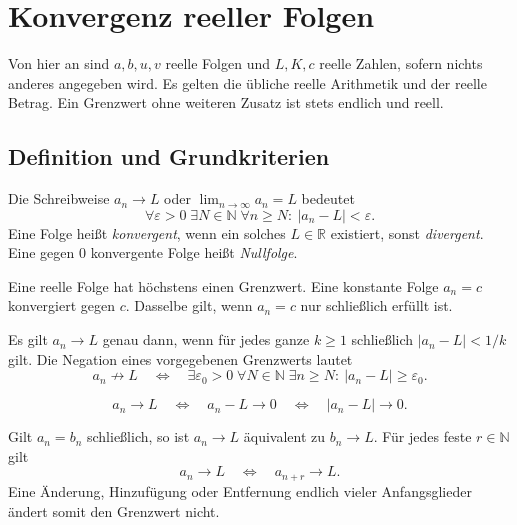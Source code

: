 \chapter{Konvergenz reeller Folgen}
\label{b21guide:ch:limits}

Von hier an sind $a,b,u,v$ reelle Folgen und $L,K,c$ reelle
Zahlen, sofern nichts anderes angegeben wird.
Es gelten die übliche reelle Arithmetik und der reelle Betrag.
Ein Grenzwert ohne weiteren Zusatz ist stets endlich und reell.

\section{Definition und Grundkriterien}

\begin{definition}
\label{b21guide:def:limit}
Die Schreibweise $a_n\to L$ oder
$\lim_{n\to\infty}a_n=L$ bedeutet
\[
 \forall\varepsilon>0\;\exists N\in\mathbb N\;
 \forall n\geq N:\ |a_n-L|<\varepsilon.
\]
Eine Folge heißt \emph{konvergent}, wenn ein solches $L\in\mathbb R$
existiert, sonst \emph{divergent}.
Eine gegen $0$ konvergente Folge heißt \emph{Nullfolge}.
\end{definition}

\begin{theorem}
Eine reelle Folge hat höchstens einen Grenzwert.
Eine konstante Folge $a_n=c$ konvergiert gegen $c$.
Dasselbe gilt, wenn $a_n=c$ nur schließlich erfüllt ist.
\end{theorem}

\begin{theorem}
\label{b21guide:thm:epsilon-test}
Es gilt $a_n\to L$ genau dann, wenn für jedes ganze $k\geq1$
schließlich $|a_n-L|<1/k$ gilt.
Die Negation eines vorgegebenen Grenzwerts lautet
\[
 a_n\not\to L
 \quad\Longleftrightarrow\quad
 \exists\varepsilon_0>0\;\forall N\in\mathbb N\;
 \exists n\geq N:\ |a_n-L|\geq\varepsilon_0.
\]
\end{theorem}

\begin{theorem}
\[
 a_n\to L
 \quad\Longleftrightarrow\quad a_n-L\to0
 \quad\Longleftrightarrow\quad |a_n-L|\to0.
\]
\end{theorem}

\begin{theorem}
\label{b21guide:thm:tail-limit}
Gilt $a_n=b_n$ schließlich, so ist
$a_n\to L$ äquivalent zu $b_n\to L$.
Für jedes feste $r\in\mathbb N$ gilt
\[
 a_n\to L\quad\Longleftrightarrow\quad a_{n+r}\to L.
\]
Eine Änderung, Hinzufügung oder Entfernung endlich vieler
Anfangsglieder ändert somit den Grenzwert nicht.
\end{theorem}


